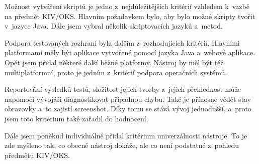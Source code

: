 \documentclass{bakalarka}
\begin{document}
Možnost vytváření skriptů je jedno z~nejdůležitějších kritérií vzhledem k~vazbě na předmět KIV/OKS. Hlavním požadavkem bylo, aby bylo možné skripty tvořit v~jazyce Java. Dále jsem vybral několik skriptovacích jazyků a~metod.

Podpora testovaných rozhraní byla dalším z~rozhodujících kritérií. Hlavními platformami měly být aplikace vytvořené pomocí jazyka Java a~webové aplikace. Opět jsem přidal některé další běžné platformy. Nástroj by měl být též multiplatformní, proto je jedním z~kritérií podpora operačních systémů.

Reportování výsledků testů, složitost jejich tvorby a~jejich přehlednost může napomoci vývojáři diagnostikovat případnou chybu. Také je přínosné vědět stav obrazovky a~to zajistí screenshot. Díky tomu se stává vývoj jednodušší, a~proto jsem toto kritérium také zařadil do hodnocení.

Dále jsem poněkud individuálně přidal kritérium univerzálnosti nástroje. To je zde myšleno tak, co obecně nástroj dokáže, ale co není podstatné z~pohledu předmětu KIV/OKS.
\end{document}
